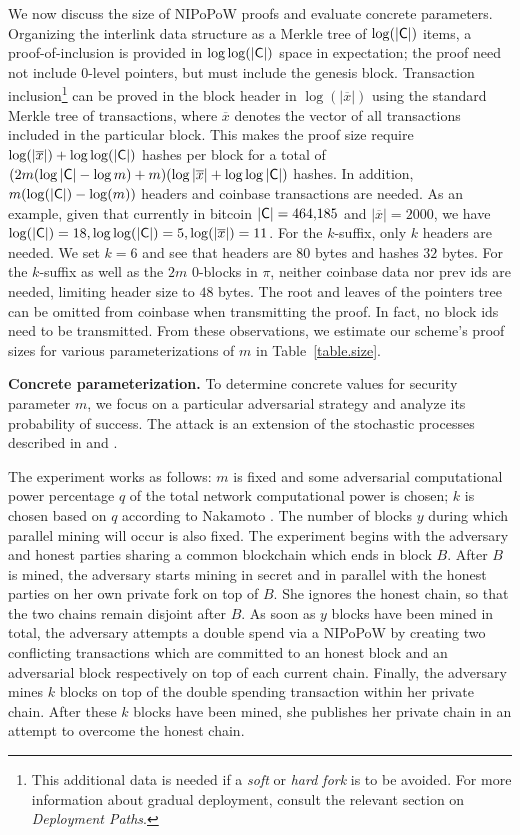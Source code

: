 We now discuss the size of NIPoPoW proofs and evaluate concrete parameters.
Organizing the interlink data structure as a Merkle tree of $\log(|\mathsf{C}|)$ items, a
proof-of-inclusion is provided in $\log \log(|\mathsf{C}|)$ space in expectation;
the proof need not include $0$-level pointers, but must include the genesis
block.
Transaction inclusion\footnote{This additional data is needed if a \emph{soft} or \emph{hard fork} is
to be avoided. For more information about gradual deployment, consult the
relevant section on \emph{Deployment Paths}.}
can be proved in the block header in
$\log(|\overline x|)$ using the standard Merkle tree of transactions, where
$\overline x$ denotes the vector of all transactions included in the particular
block.
This makes the proof size require $\log(|\overline x|) +
\log\log(|\mathsf{C}|)$ hashes per block for a total of
$(2m (\log|\mathsf{C}| - \log{m}) + m)(\log|\overline x| + \log\log|\mathsf{C}|)$
hashes. In addition, $m
(\log(|\mathsf{C}|) - \log(m))$ headers and coinbase transactions are needed. As an
example, given that currently in bitcoin $|\mathsf{C}| = 464{,}185$ and $|\overline x|
= 2000$, we have $\log(|\mathsf{C}|) = 18, \log\log(|\mathsf{C}|) = 5, \log(|\overline
x|) = 11$. For the $k$-suffix, only $k$ headers are needed. We set $k = 6$ and
see that headers are $80$ bytes and hashes $32$ bytes. For the $k$-suffix as
well as the $2m$ $0$-blocks in $\pi$, neither coinbase data nor prev ids are
needed, limiting header size to $48$ bytes. The root and leaves of the pointers
tree can be omitted from coinbase when transmitting the proof. In fact, no block
ids need to be transmitted. From these observations, we estimate our scheme's
proof sizes for various parameterizations of $m$ in Table~\ref{table.size}.

\noindent
\textbf{Concrete parameterization.}
To determine concrete values for security parameter $m$, we focus on a
particular adversarial strategy and analyze its probability of success.
The attack is an extension of the stochastic processes described in
\cite{bitcoin} and \cite{rosenfeld}.

The experiment works as follows: $m$ is fixed and some adversarial computational
power percentage $q$ of the total network computational power is chosen; $k$ is
chosen based on $q$ according to Nakamoto \cite{bitcoin}. The number of blocks
$y$ during which parallel mining will occur is also fixed. The experiment begins
with the adversary and honest parties sharing a common blockchain which ends in
block $B$. After $B$ is mined, the adversary starts mining in secret and in
parallel with the honest parties on her own private fork on top of $B$. She
ignores the honest chain, so that the two chains remain disjoint after $B$. As
soon as $y$ blocks have been mined in total, the adversary attempts a double
spend via a NIPoPoW
by creating two conflicting transactions which are committed to an honest
block and an adversarial block respectively on top of each current chain.
Finally, the adversary mines $k$ blocks on top of the double spending
transaction within her private chain. After these $k$ blocks have been mined,
she publishes her private chain in an attempt to overcome the honest chain.


